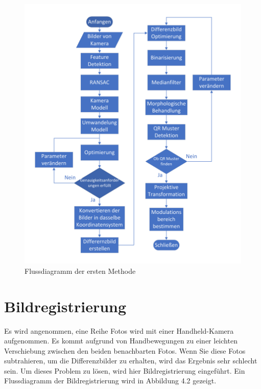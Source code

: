 \begin{figure}[H]
 \centering 
 \includegraphics[keepaspectratio,width=1.0\textwidth]{images/3_Ersteverfahren/Flussdiagrammsum.pdf}
 \caption{Flussdiagramm der ersten Methode}
 \label{fig:Flussdiagramm der Methode}
\end{figure}

\section{Bildregistrierung} 

Es wird angenommen, eine Reihe Fotos wird mit einer Handheld-Kamera aufgenommen. Es kommt aufgrund von Handbewegungen zu einer leichten Verschiebung zwischen den beiden benachbarten Fotos. Wenn Sie diese Fotos subtrahieren, um die Differenzbilder zu erhalten, wird das Ergebnis sehr schlecht sein. Um dieses Problem zu lösen, wird hier Bildregistrierung eingeführt. Ein Flussdiagramm der Bildregistrierung wird in Abbildung 4.2 gezeigt. 

